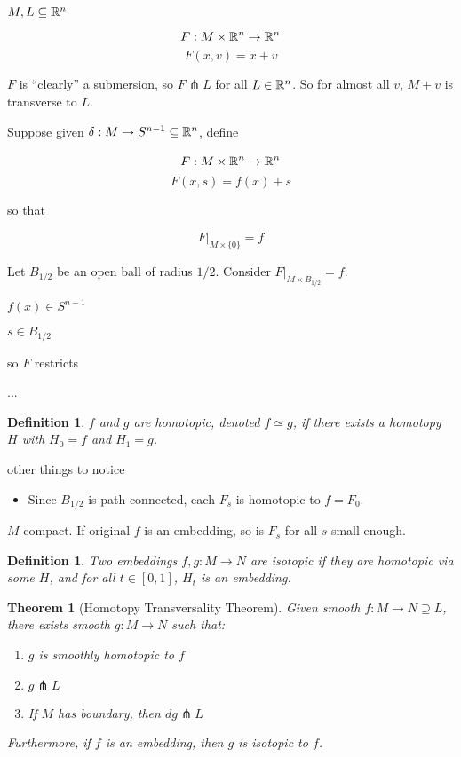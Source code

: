 \documentclass[11pt,leqno,oneside]{amsart}
\newcommand{\homotopic}{\simeq}
\newcommand{\transverse}{\pitchfork}
\newcommand{\x}{\times}
\newcommand{\de}{\emph}
\theoremstyle{mystyle} \newtheorem{thrm}[thm]{Theorem}
\theoremstyle{mystyle} \newtheorem{defi}[thm]{Definition}
\begin{document}
\begin{example}
	$M, L \subseteq {\mathbb R}^n$

	$$F: M \x \R^n \to \R^n$$
	$$F(x,v) = x+v$$

	$F$ is ``clearly'' a submersion, so $F \transverse L$ for all $L \in {\mathbb R}^n$.  So for almost all $v$, $M+v$ is transverse to $L$.
\end{example}

\begin{example}
	Suppose given $\delta: M \to S^{n-1} \subseteq {\mathbb R}^n$, define

	$$\overset{~}{F}: M \x \R^n \to \R^n$$
	$$\overset{~}{F}(x,s) = f(x) + s$$

	so that

	$$\overset{~}{F}|_{M \x \{0\}} = f$$

	Let $B_{1/2}$ be an open ball of radius $1/2$.
	Consider $\overset{~}{F}|_{M \x B_{1/2}} = f$.

	$f(x) \in S^{n-1}$

	$s \in B_{1/2}$

	so $\overset{~}{F}$ restricts

	...




\begin{defi}
	$f$ and $g$ are \de{homotopic}, denoted $f \homotopic g$, if there exists a homotopy $H$ with $H_0 = f$ and $H_1 = g$.
\end{defi}
other things to notice
\begin{itemize}
	\item Since $B_{1/2}$ is path connected, each $F_s$ is homotopic to $f = F_0$.
\end{itemize}
\end{example}
\begin{thm}
	$M$ compact.
	If original $f$ is an embedding, so is $F_s$ for all $s$ small enough.
\end{thm}
\begin{defi}
	Two embeddings $f,g : M \to N$ are \de{isotopic} if they are homotopic via some $H$, and for all $t \in [0,1]$, $H_t$ is an embedding.
\end{defi}
\begin{thrm}[Homotopy Transversality Theorem]
	Given smooth $f: M \to N \supseteq L$, there exists smooth $g: M \to N$ such that:
	\begin{enumerate}
		\item $g$ is smoothly homotopic to $f$
		\item $g \transverse L$
		\item If $M$ has boundary, then $dg \transverse L$
	\end{enumerate}
	Furthermore, if $f$ is an embedding, then $g$ is isotopic to $f$.
\end{thrm}
\end{document}
